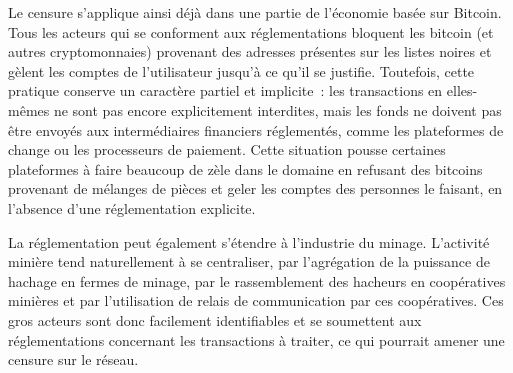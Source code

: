 Le censure s'applique ainsi déjà dans une partie de l'économie basée sur Bitcoin. Tous les acteurs qui se conforment aux réglementations bloquent les bitcoin (et autres cryptomonnaies) provenant des adresses présentes sur les listes noires et gèlent les comptes de l'utilisateur jusqu'à ce qu'il se justifie. Toutefois, cette pratique conserve un caractère partiel et implicite~: les transactions en elles-mêmes ne sont pas encore explicitement interdites, mais les fonds ne doivent pas être envoyés aux intermédiaires financiers réglementés, comme les plateformes de change ou les processeurs de paiement. Cette situation pousse certaines plateformes à faire beaucoup de zèle dans le domaine en refusant des bitcoins provenant de mélanges de pièces et geler les comptes des personnes le faisant, en l'absence d'une réglementation explicite.

La réglementation peut également s'étendre à l'industrie du minage. L'activité minière tend naturellement à se centraliser, par l'agrégation de la puissance de hachage en fermes de minage, par le rassemblement des hacheurs en coopératives minières et par l'utilisation de relais de communication par ces coopératives. Ces gros acteurs sont donc facilement identifiables et se soumettent aux réglementations concernant les transactions à traiter, ce qui pourrait amener une censure sur le réseau.

